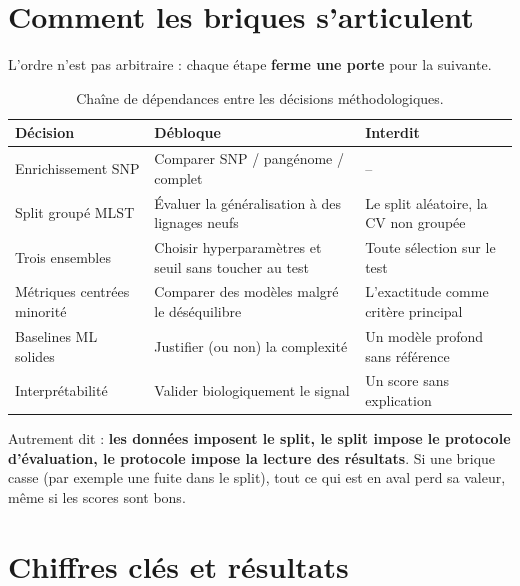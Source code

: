 \documentclass[11pt,a4paper]{article}
\begin{document}
\section{Comment les briques s'articulent}

L'ordre n'est pas arbitraire : chaque étape \textbf{ferme une porte} pour la suivante.

\begin{table}[H]
\centering
\caption{Chaîne de dépendances entre les décisions méthodologiques.}
\label{tab:articulation}
\small
\begin{tabularx}{\textwidth}{>{\raggedright\arraybackslash}p{3.9cm}>{\raggedright\arraybackslash}X>{\raggedright\arraybackslash}X}
\toprule
\textbf{Décision} & \textbf{Débloque} & \textbf{Interdit} \\
\midrule
Enrichissement SNP & Comparer SNP / pangénome / complet & -- \\
Split groupé MLST & Évaluer la généralisation à des lignages neufs & Le split aléatoire, la CV non groupée \\
Trois ensembles & Choisir hyperparamètres et seuil sans toucher au test & Toute sélection sur le test \\
Métriques centrées minorité & Comparer des modèles malgré le déséquilibre & L'exactitude comme critère principal \\
Baselines ML solides & Justifier (ou non) la complexité & Un modèle profond sans référence \\
Interprétabilité & Valider biologiquement le signal & Un score sans explication \\
\bottomrule
\end{tabularx}
\end{table}

Autrement dit : \textbf{les données imposent le split, le split impose le protocole d'évaluation, le protocole impose la lecture des résultats}. Si une brique casse (par exemple une fuite dans le split), tout ce qui est en aval perd sa valeur, même si les scores sont bons.

\section{Chiffres clés et résultats}
\end{document}

